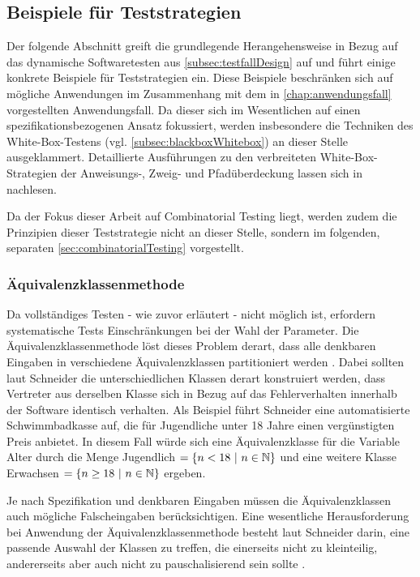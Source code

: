 \subsection{Beispiele für Teststrategien}\label{subsec:beispieleTests}

Der folgende Abschnitt greift die grundlegende Herangehensweise in Bezug auf das dynamische Softwaretesten aus \autoref{subsec:testfallDesign} auf und führt einige konkrete Beispiele für Teststrategien ein. Diese Beispiele beschränken sich auf mögliche Anwendungen im Zusammenhang mit dem in \autoref{chap:anwendungsfall} vorgestellten Anwendungsfall. Da dieser sich im Wesentlichen auf einen spezifikationsbezogenen Ansatz fokussiert, werden insbesondere die Techniken des White-Box-Testens (vgl. \autoref{subsec:blackboxWhitebox}) an dieser Stelle ausgeklammert. Detaillierte Ausführungen zu den verbreiteten White-Box-Strategien der Anweisungs-, Zweig- und Pfadüberdeckung lassen sich in \cite[S. 108 ff.]{schneider2012abenteuer} nachlesen.

Da der Fokus dieser Arbeit auf Combinatorial Testing liegt, werden zudem die Prinzipien dieser Teststrategie nicht an dieser Stelle, sondern im folgenden, separaten \autoref{sec:combinatorialTesting} vorgestellt.

\subsubsection{Äquivalenzklassenmethode}\label{subsub:äquivalenklassenmethode}

Da vollständiges Testen - wie zuvor erläutert - nicht möglich ist, erfordern systematische Tests Einschränkungen bei der Wahl der Parameter. Die Äquivalenzklassenmethode löst dieses Problem derart, dass alle denkbaren Eingaben in verschiedene Äquivalenzklassen partitioniert werden \cite[S. 94]{schneider2012abenteuer}. Dabei sollten laut Schneider \cite[S. 94 ff.]{schneider2012abenteuer} die unterschiedlichen Klassen derart konstruiert werden, dass Vertreter aus derselben Klasse sich in Bezug auf das Fehlerverhalten innerhalb der Software identisch verhalten. Als Beispiel führt Schneider eine automatisierte Schwimmbadkasse auf, die für Jugendliche unter 18 Jahre einen vergünstigten Preis anbietet. In diesem Fall würde sich eine Äquivalenzklasse für die Variable \glqq Alter\grqq{} durch die Menge \glqq Jugendlich\grqq{} $= \{n < 18 ~ | ~ n \in \mathbb{N}\}$ und eine weitere Klasse \glqq Erwachsen\grqq{} $= \{n \geq 18 ~ | ~ n \in \mathbb{N}\}$ ergeben. 

Je nach Spezifikation und denkbaren Eingaben müssen die Äquivalenzklassen auch mögliche Falscheingaben berücksichtigen. Eine wesentliche Herausforderung bei Anwendung der Äquivalenzklassenmethode besteht laut Schneider darin, eine passende Auswahl der Klassen zu treffen, die einerseits nicht zu kleinteilig, andererseits aber auch nicht zu pauschalisierend sein sollte \cite[S. 95]{schneider2012abenteuer}.

